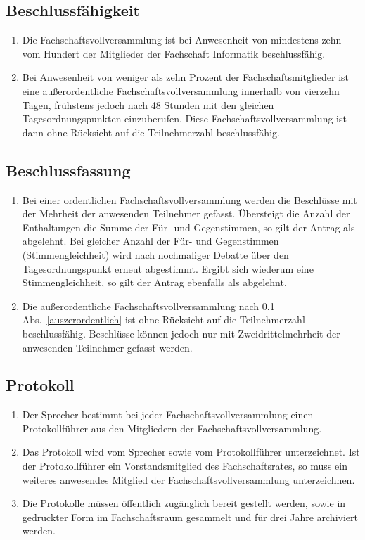 \subsection{Beschlussfähigkeit}
\label{sec:beschlussfaehigkeit}
\begin{enumerate}
	\item Die Fachschaftsvollversammlung ist bei Anwesenheit von mindestens zehn vom Hundert der Mitglieder der Fachschaft Informatik beschlussfähig.
	\item \label{auszerordentlich} Bei Anwesenheit von weniger als zehn Prozent der Fachschaftsmitglieder ist eine außerordentliche Fachschaftsvollversammlung innerhalb von vierzehn Tagen, frühstens jedoch nach 48 Stunden mit den gleichen Tagesordnungspunkten einzuberufen. Diese Fachschaftsvollversammlung ist dann ohne Rücksicht auf die Teilnehmerzahl beschlussfähig.
\end{enumerate}

\subsection{Beschlussfassung}
\begin{enumerate}
	\item Bei einer ordentlichen Fachschaftsvollversammlung werden die Beschlüsse mit der Mehrheit der anwesenden Teilnehmer gefasst. Übersteigt die Anzahl der Enthaltungen die Summe der Für- und Gegenstimmen, so gilt der Antrag als abgelehnt. Bei gleicher Anzahl der Für- und Gegenstimmen (Stimmengleichheit) wird nach nochmaliger Debatte über den Tagesordnungspunkt erneut abgestimmt. Ergibt sich wiederum eine Stimmengleichheit, so gilt der Antrag ebenfalls als abgelehnt.
	\item Die außerordentliche Fachschaftsvollversammlung nach \ref{sec:beschlussfaehigkeit} Abs.~\ref{auszerordentlich} ist ohne Rücksicht auf die Teilnehmerzahl beschlussfähig. Beschlüsse können jedoch nur mit Zweidrittelmehrheit der anwesenden Teilnehmer gefasst werden.
\end{enumerate}

\subsection{Protokoll}
\begin{enumerate}
	\item Der Sprecher bestimmt bei jeder Fachschaftsvollversammlung einen Protokollführer aus den Mitgliedern der Fachschaftsvollversammlung.
	\item Das Protokoll wird vom Sprecher sowie vom Protokollführer unterzeichnet. Ist der Protokollführer ein Vorstandsmitglied des Fachschaftsrates, so muss ein weiteres anwesendes Mitglied der Fachschaftsvollversammlung unterzeichnen.
	\item Die Protokolle müssen öffentlich zugänglich bereit gestellt werden, sowie in gedruckter Form im Fachschaftsraum gesammelt und für drei Jahre archiviert werden.
\end{enumerate}
